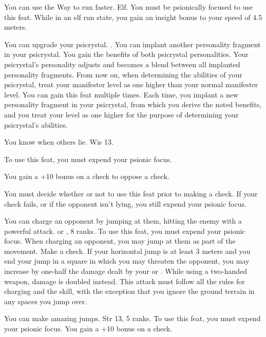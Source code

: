 {You can use the Way to run faster.}
{Elf.}
{You must be psionically focused to use this feat. While in an elf run state, you gain an insight bonus to your speed of 4.5 meters.}
{}{}

{You can upgrade your psicrystal.}
{.}
{You can implant another personality fragment in your psicrystal. You gain the benefits of both psicrystal personalities. Your psicrystal's personality adjusts and becomes a blend between all implanted personality fragments. From now on, when determining the abilities of your psicrystal, treat your manifester level as one higher than your normal manifester level.}
{}
{You can gain this feat multiple times. Each time, you implant a new personality fragment in your psicrystal, from which you derive the noted benefits, and you treat your level as one higher for the purpose of determining your psicrystal's abilities.}

{You know when others lie.}
{Wis 13.}
{To use this feat, you must expend your psionic focus.

You gain a +10 bonus on a  check to oppose a  check.

You must decide whether or not to use this feat prior to making a  check. If your check fails, or if the opponent isn't lying, you still expend your psionic focus.}
{}{}

{You can charge an opponent by jumping at them, hitting the enemy with a powerful attack.}
{ or ,  8 ranks.}
{To use this feat, you must expend your psionic focus. When charging an opponent, you may jump at them as part of the movement. Make a  check. If your horizontal jump is at least 3 meters and you end your jump in a square in which you may threaten the opponent, you may increase by one-half the damage dealt by your  or . While using a two-handed weapon, damage is doubled instead. This attack must follow all the rules for charging and the  skill, with the exception that you ignore the ground terrain in any spaces you jump over.}
{}{}

{You can make amazing jumps.}
{Str 13,  5 ranks.}
{To use this feat, you must expend your psionic focus. You gain a +10 bonus on a  check.}
{}{}

